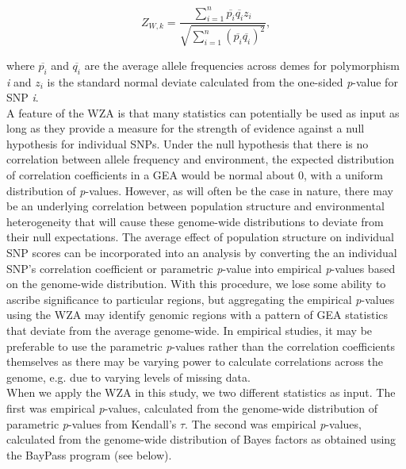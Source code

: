 \documentclass[10pt,twoside,lineno, twocolumn]{GSA_format}
\begin{document}
\begin{equation}
\label{weightedZ}
Z_{W,k} =  \frac {\sum\limits_{i=1}^n \overline{p_i} \overline{q_i}z_i}{\sqrt{ \sum\limits_{i=1}^n (\overline{p_i}\overline{q_i})^2} },
\end{equation}

\noindent where $\overline{p_i}$ and $\overline{q_i}$ are the average allele frequencies across demes for polymorphism \textit{i} and $z_i$ is the standard normal deviate calculated from the one-sided \textit{p}-value for SNP \textit{i}. \\

A feature of the WZA is that many statistics can potentially be used as input as long as they provide a measure for the strength of evidence against a null hypothesis for individual SNPs. Under the null hypothesis that there is no correlation between allele frequency and environment, the expected distribution of correlation coefficients in a GEA would be normal about 0, with a uniform distribution of \textit{p}-values. However, as will often be the case in nature, there may be an underlying correlation between population structure and environmental heterogeneity that will cause these genome-wide distributions to deviate from their null expectations. The average effect of population structure on individual SNP scores can be incorporated into an analysis by converting the an individual SNP's correlation coefficient or parametric \textit{p}-value into empirical \textit{p}-values based on the genome-wide distribution. With this procedure, we lose some ability to ascribe significance to particular regions, but aggregating the empirical \textit{p}-values using the WZA may identify genomic regions with a pattern of GEA statistics that deviate from the average genome-wide. In empirical studies, it may be preferable to use the parametric \textit{p}-values rather than the correlation coefficients themselves as there may be varying power to calculate correlations across the genome, e.g. due to varying levels of missing data. \\

When we apply the WZA in this study, we two different statistics as input. The first was empirical \textit{p}-values, calculated from the genome-wide distribution of parametric \textit{p}-values from Kendall's $\tau$. The second was empirical \textit{p}-values, calculated from the genome-wide distribution of Bayes factors as obtained using the BayPass program (see below). 

\end{document}
